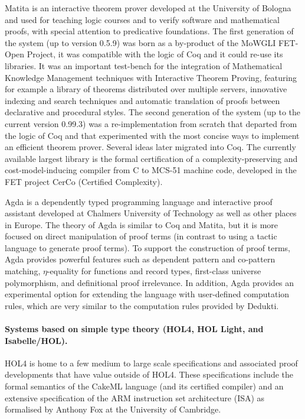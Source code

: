 Matita is an interactive theorem prover developed at the University of
Bologna and used for teaching logic courses and to verify software and
mathematical proofs, with special attention to predicative
foundations. The first generation of the system (up to version 0.5.9)
was born as a by-product of the MoWGLI FET-Open Project, it was
compatible with the logic of Coq and it could re-use its libraries. It
was an important test-bench for the integration of Mathematical
Knowledge Management techniques with Interactive Theorem Proving,
featuring for example a library of theorems distributed over multiple
servers, innovative indexing and search techniques and automatic
translation of proofs between declarative and procedural styles. The
second generation of the system (up to the current version 0.99.3) was
a re-implementation from scratch that departed from the logic of Coq
and that experimented with the most concise ways to implement an
efficient theorem prover. Several ideas later migrated into Coq. The
currently available largest library is the formal certification of a
complexity-preserving and cost-model-inducing compiler from C to
MCS-51 machine code, developed in the FET project CerCo (Certified
Complexity).

Agda is a dependently typed programming language and interactive proof
assistant developed at Chalmers University of Technology as well as
other places in Europe. The theory of Agda is similar to Coq and
Matita, but it is more focused on direct
manipulation of proof terms (in contrast to using a tactic language to
generate proof terms). To support the construction of proof terms,
Agda provides powerful features such as dependent pattern and
co-pattern matching, $\eta$-equality for functions and record types,
first-class universe polymorphism, and definitional proof
irrelevance. In addition, Agda provides an experimental option for
extending the language with user-defined computation rules, which are very
similar to the computation rules provided by Dedukti.

\paragraph*{Systems based on simple type theory (HOL4, HOL Light, and Isabelle/HOL).}

HOL4 is home to a few medium to large scale specifications and
associated proof developments that have value outside of HOL4. These
specifications include the formal semantics of the CakeML language
(and its certified compiler) and an extensive specification of the ARM
instruction set architecture (ISA) as formalised by Anthony Fox at the
University of Cambridge.

